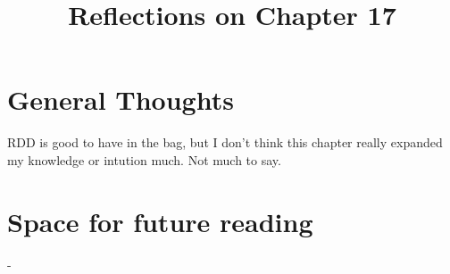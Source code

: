 \documentclass[10pt, english]{article}
\begin{document}
\title{Reflections on Chapter 17}
\date{}
\author{}

\maketitle


\section*{General Thoughts}
RDD is good to have in the bag, but I don't think this chapter really expanded my 
knowledge or intution much. Not much to say.

\section*{Space for future reading}
-
\end{document}
